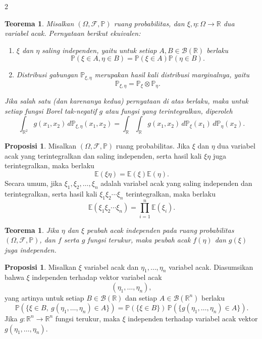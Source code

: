 \documentclass[a4paper,extrafontsizes, 9pt]{memoir}
\theoremstyle{definition}
\newtheorem{proposisi}[kalstok]{Proposisi}
\theoremstyle{plain}
\newtheorem{teorema}[kalstok]{Teorema}
\theoremstyle{remark}
\begin{document}
\begin{multicols}{2}
  \begin{teorema}
    Misalkan $(\Omega,\mathcal{F},\mathbb{P})$ ruang probabilitas, dan
    $\xi,\eta:\Omega\to\mathbb{R}$ dua variabel acak.
    Pernyataan berikut ekuivalen:
    \begin{enumerate}[leftmargin=*, itemsep=0.5mm]
      \item $\xi$ dan $\eta$ saling independen, yaitu untuk setiap $A,B\in\mathcal{B}(\mathbb{R})$ berlaku
            \[\mathbb{P}(\xi\in A,\eta\in B)=\mathbb{P}(\xi\in A)\mathbb{P}(\eta\in B).\]
      \item Distribusi gabungan $\mathbb{P}_{\xi,\eta}$ merupakan hasil kali distribusi marginalnya,
            yaitu
            \[\mathbb{P}_{\xi,\eta}=\mathbb{P}_{\xi}\otimes\mathbb{P}_{\eta}.\]
    \end{enumerate}
    Jika salah satu (dan karenanya kedua) pernyataan di atas berlaku, maka untuk setiap
    fungsi Borel tak-negatif $g$ atau fungsi yang terintegralkan, diperoleh
    \[\int_{\mathbb{R}^2}g(x_1,x_2)\,d\mathbb{P}_{\xi,\eta}(x_1,x_2)
      =\int_{\mathbb{R}}\int_{\mathbb{R}}g(x_1,x_2)\,d\mathbb{P}_{\xi}(x_1)\,d\mathbb{P}_{\eta}(x_2).\]
  \end{teorema}

  \begin{proposisi}
    Misalkan $(\Omega,\mathcal{F},\mathbb{P})$ ruang probabilitas.
    Jika $\xi$ dan $\eta$ dua variabel acak yang terintegralkan dan saling independen,
    serta hasil kali $\xi\eta$ juga terintegralkan, maka berlaku
    \[\mathbb{E}(\xi\eta)=\mathbb{E}(\xi)\mathbb{E}(\eta).\]
    Secara umum, jika $\xi_1,\xi_2,\ldots,\xi_n$ adalah variabel acak yang saling independen
    dan terintegralkan, serta hasil kali $\xi_1\xi_2\cdots\xi_n$ terintegralkan,
    maka berlaku
    \[\mathbb{E}(\xi_1\xi_2\cdots\xi_n)=\prod_{i=1}^{n}\mathbb{E}(\xi_i).\]
  \end{proposisi}

  \begin{teorema}
    Jika $\eta$ dan $\xi$ peubah acak independen pada ruang probabilitas $(\Omega,\mathcal{F},\mathbb{P})$,
    dan $f$ serta $g$ fungsi terukur, maka peubah acak $f(\eta)$ dan $g(\xi)$ juga independen.
  \end{teorema}

  \begin{proposisi}
    Misalkan $\xi$ variabel acak dan $\eta_1,\ldots,\eta_n$ variabel acak.
    Diasumsikan bahwa $\xi$ independen terhadap vektor variabel acak
    \[(\eta_1,\ldots,\eta_n),\]
    yang artinya untuk setiap $B\in\mathcal{B}(\mathbb{R})$ dan setiap $A\in\mathcal{B}(\mathbb{R}^n)$ berlaku
    \[\mathbb{P}(\{\xi\in B,\ g(\eta_1,\ldots,\eta_n)\in A\})
      =\mathbb{P}(\{\xi\in B\})\,\mathbb{P}(\{g(\eta_1,\ldots,\eta_n)\in A\}).\]
    Jika $g:\mathbb{R}^n\to\mathbb{R}^n$ fungsi terukur, maka $\xi$ independen terhadap
    variabel acak vektor $g(\eta_1,\ldots,\eta_n)$.
  \end{proposisi}


\end{multicols}
\end{document}
